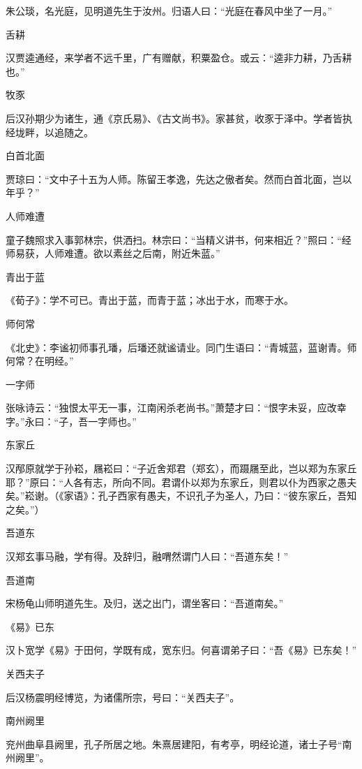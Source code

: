\documentclass[a4paper,12pt,UTF8,twoside]{ctexbook}
\begin{document}
    朱公琰，名光庭，见明道先生于汝州。归语人曰：“光庭在春风中坐了一月。”
    
    舌耕
    
    汉贾逵通经，来学者不远千里，广有赠献，积粟盈仓。或云：“逵非力耕，乃舌耕也。”
    
    牧豕
    
    后汉孙期少为诸生，通《京氏易》、《古文尚书》。家甚贫，收豕于泽中。学者皆执经垅畔，以追随之。
    
    白首北面
    
    贾琼曰：“文中子十五为人师。陈留王孝逸，先达之傲者矣。然而白首北面，岂以年乎？”
    
    人师难遭
    
    童子魏照求入事郭林宗，供洒扫。林宗曰：“当精义讲书，何来相近？”照曰：“经师易获，人师难遭。欲以素丝之后南，附近朱蓝。”
    
    青出于蓝
    
    《荀子》：学不可已。青出于蓝，而青于蓝；冰出于水，而寒于水。
    
    师何常
    
    《北史》：李谧初师事孔璠，后璠还就谧请业。同门生语曰：“青城蓝，蓝谢青。师何常？在明经。”
    
    一字师
    
    张咏诗云：“独恨太平无一事，江南闲杀老尚书。”萧楚才曰：“恨字未妥，应改幸字。”永曰：“子，吾一字师也。”
    
    东家丘
    
    汉邴原就学于孙崧，屩崧曰：“子近舍郑君（郑玄），而蹑屩至此，岂以郑为东家丘耶？”原曰：“人各有志，所向不同。君谓仆以郑为东家丘，则君以仆为西家之愚夫矣。”崧谢。（《家语》：孔子西家有愚夫，不识孔子为圣人，乃曰：“彼东家丘，吾知之矣。”）
    
    吾道东
    
    汉郑玄事马融，学有得。及辞归，融喟然谓门人曰：“吾道东矣！”
    
    吾道南
    
    宋杨龟山师明道先生。及归，送之出门，谓坐客曰：“吾道南矣。”
    
    《易》已东
    
    汉卜宽学《易》于田何，学既有成，宽东归。何喜谓弟子曰：“吾《易》已东矣！”
    
    关西夫子
    
    后汉杨震明经博览，为诸儒所宗，号曰：“关西夫子”。
    
    南州阙里
    
    兖州曲阜县阙里，孔子所居之地。朱熹居建阳，有考亭，明经论道，诸士子号“南州阙里”。
    
\end{document}
